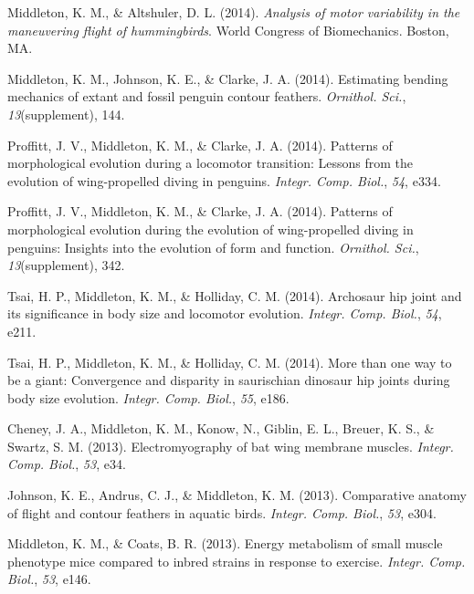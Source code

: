 \documentclass[11pt, a4paper]{awesome-cv}
\begin{document}
\leavevmode\hypertarget{ref-middleton_analysis_2014}{}%
Middleton, K. M., \& Altshuler, D. L. (2014). \emph{Analysis of motor
variability in the maneuvering flight of hummingbirds}. World Congress
of Biomechanics. Boston, MA.

\leavevmode\hypertarget{ref-middleton_estimating_2014}{}%
Middleton, K. M., Johnson, K. E., \& Clarke, J. A. (2014). Estimating
bending mechanics of extant and fossil penguin contour feathers.
\emph{Ornithol. Sci.}, \emph{13}(supplement), 144.

\leavevmode\hypertarget{ref-proffitt_patterns_2014a}{}%
Proffitt, J. V., Middleton, K. M., \& Clarke, J. A. (2014). Patterns of
morphological evolution during a locomotor transition: Lessons from the
evolution of wing-propelled diving in penguins. \emph{Integr. Comp.
Biol.}, \emph{54}, e334.

\leavevmode\hypertarget{ref-proffitt_patterns_2014}{}%
Proffitt, J. V., Middleton, K. M., \& Clarke, J. A. (2014). Patterns of
morphological evolution during the evolution of wing-propelled diving in
penguins: Insights into the evolution of form and function.
\emph{Ornithol. Sci.}, \emph{13}(supplement), 342.

\leavevmode\hypertarget{ref-tsai_archosaur_2014}{}%
Tsai, H. P., Middleton, K. M., \& Holliday, C. M. (2014). Archosaur hip
joint and its significance in body size and locomotor evolution.
\emph{Integr. Comp. Biol.}, \emph{54}, e211.

\leavevmode\hypertarget{ref-tsai_more_2014a}{}%
Tsai, H. P., Middleton, K. M., \& Holliday, C. M. (2014). More than one
way to be a giant: Convergence and disparity in saurischian dinosaur hip
joints during body size evolution. \emph{Integr. Comp. Biol.},
\emph{55}, e186.

\leavevmode\hypertarget{ref-cheney_electromyography_2013}{}%
Cheney, J. A., Middleton, K. M., Konow, N., Giblin, E. L., Breuer, K.
S., \& Swartz, S. M. (2013). Electromyography of bat wing membrane
muscles. \emph{Integr. Comp. Biol.}, \emph{53}, e34.

\leavevmode\hypertarget{ref-johnson_comparative_2013}{}%
Johnson, K. E., Andrus, C. J., \& Middleton, K. M. (2013). Comparative
anatomy of flight and contour feathers in aquatic birds. \emph{Integr.
Comp. Biol.}, \emph{53}, e304.

\leavevmode\hypertarget{ref-middleton_energy_2013}{}%
Middleton, K. M., \& Coats, B. R. (2013). Energy metabolism of small
muscle phenotype mice compared to inbred strains in response to
exercise. \emph{Integr. Comp. Biol.}, \emph{53}, e146.
\end{document}

